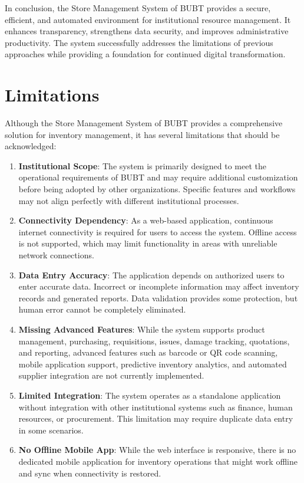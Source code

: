 In conclusion, the Store Management System of BUBT provides a secure, efficient, and automated environment for institutional resource management. It enhances transparency, strengthens data security, and improves administrative productivity. The system successfully addresses the limitations of previous approaches while providing a foundation for continued digital transformation.

\section{Limitations}

Although the Store Management System of BUBT provides a comprehensive solution for inventory management, it has several limitations that should be acknowledged:

\begin{enumerate}
    \item \textbf{Institutional Scope}: The system is primarily designed to meet the operational requirements of BUBT and may require additional customization before being adopted by other organizations. Specific features and workflows may not align perfectly with different institutional processes.

    \item \textbf{Connectivity Dependency}: As a web-based application, continuous internet connectivity is required for users to access the system. Offline access is not supported, which may limit functionality in areas with unreliable network connections.

    \item \textbf{Data Entry Accuracy}: The application depends on authorized users to enter accurate data. Incorrect or incomplete information may affect inventory records and generated reports. Data validation provides some protection, but human error cannot be completely eliminated.

    \item \textbf{Missing Advanced Features}: While the system supports product management, purchasing, requisitions, issues, damage tracking, quotations, and reporting, advanced features such as barcode or QR code scanning, mobile application support, predictive inventory analytics, and automated supplier integration are not currently implemented.

    \item \textbf{Limited Integration}: The system operates as a standalone application without integration with other institutional systems such as finance, human resources, or procurement. This limitation may require duplicate data entry in some scenarios.

    \item \textbf{No Offline Mobile App}: While the web interface is responsive, there is no dedicated mobile application for inventory operations that might work offline and sync when connectivity is restored.
\end{enumerate}

